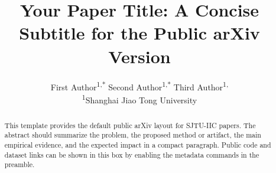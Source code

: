 \documentclass[11pt,a4paper]{article}
\title{%
  Your Paper Title: A Concise Subtitle for the Public arXiv Version
}
\author{%
  First Author\textsuperscript{1,*}\hspace{0.55em}
  Second Author\textsuperscript{1,*}\hspace{0.55em}
  Third Author\textsuperscript{1,\dag}\\[2pt]
  {\sjtuiicAffilFont
  \textsuperscript{1}Shanghai Jiao Tong University}
}
\begin{document}
\begin{abstract}
This template provides the default public arXiv layout for SJTU-IIC papers. The
abstract should summarize the problem, the proposed method or artifact, the main
empirical evidence, and the expected impact in a compact paragraph. Public code
and dataset links can be shown in this box by enabling the metadata commands in
the preamble.
\end{abstract}

\maketitle







\small



\appendix

\end{document}
